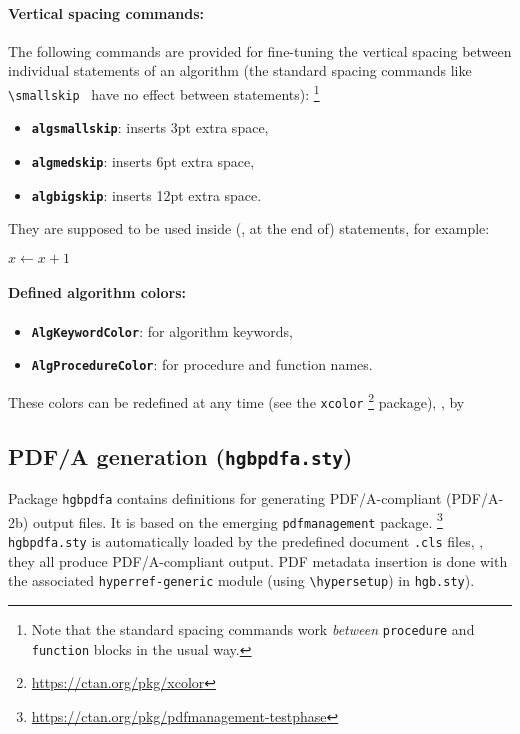 \documentclass[english]{hgbarticle}
\begin{document}
\paragraph{Vertical spacing commands:}
The following commands are provided for fine-tuning the vertical spacing
between individual statements of an algorithm (the standard spacing commands
like \verb!\smallskip! \etc\ have no effect between statements):%
\footnote{Note that the standard spacing commands work \emph{between}
\texttt{procedure} and \texttt{function} blocks in the usual way.}
\begin{itemize}
    \item \textbf{{\bs}\texttt{algsmallskip}}: inserts 3pt extra space,
    \item \textbf{{\bs}\texttt{algmedskip}}: inserts 6pt extra space,
    \item \textbf{{\bs}\texttt{algbigskip}}: inserts 12pt extra space.
\end{itemize}
They are supposed to be used inside (\ie, at the end of) statements, for
example:
%
\begin{LaTeXCode}[numbers=none]
    \State $x \gets x + 1$ \algsmallskip
\end{LaTeXCode}

\paragraph{Defined algorithm colors:}
\begin{itemize}
    \item \textbf{\texttt{AlgKeywordColor}}: for algorithm keywords,
    \item \textbf{\texttt{AlgProcedureColor}}: for procedure and function names.
\end{itemize}
These colors can be redefined at any time (see the \texttt{xcolor}%
\footnote{\url{https://ctan.org/pkg/xcolor}}
package), \eg, by
\begin{LaTeXCode}[numbers=none]
\end{LaTeXCode}


\subsection{PDF/A generation (\texttt{hgbpdfa.sty})}

Package \texttt{hgbpdfa} contains definitions for generating PDF/A-compliant 
(PDF/A-2b) output files. It is based on the emerging  \texttt{pdfmanagement} package.%
\footnote{\url{https://ctan.org/pkg/pdfmanagement-testphase}}
\texttt{hgbpdfa.sty} is automatically loaded by the predefined document \texttt{.cls} files,
\ie, they all produce PDF/A-compliant output.
PDF metadata insertion is done with the associated \texttt{hyperref-generic} 
module (using \verb!\hypersetup!) in \texttt{hgb.sty}).
\end{document}
